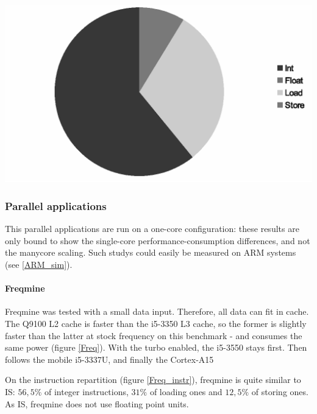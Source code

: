 \documentclass{article}
\newenvironment{Figure}
  {\par\medskip\noindent\center\minipage{0.9\linewidth}}
  {\endminipage\par\bigskip\medskip}
\begin{document}
\begin{multicols}{2}
\begin{Figure}
\centering
\includegraphics[width=\linewidth]{IS_instr.eps}
\end{Figure}

\subsubsection{Parallel applications}
This parallel applications are run on a one-core configuration: these results are only bound to show the single-core performance-consumption differences, and not the manycore scaling. Such studys could easily be measured on ARM systems (see \ref{ARM_sim}).

\paragraph{Freqmine\\}
Freqmine was tested with a small data input. Therefore, all data can fit in cache. The Q9100 L2 cache is faster than the i5-3350 L3 cache, so the former is slightly faster than the latter at stock frequency on this benchmark - and consumes the same power (figure \ref{Freq}). With the turbo enabled, the i5-3550 stays first. Then follows the mobile i5-3337U, and finally the Cortex-A15

On the instruction repartition (figure \ref{Freq_instr}), freqmine is quite similar to IS: $56,5\%$ of integer instructions, $31\%$ of loading ones and $12,5\%$ of storing ones. As IS, freqmine does not use floating point units.


\end{multicols}
\end{document}
